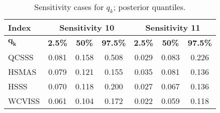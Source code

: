 \documentclass[11pt]{book}\usepackage[]{graphicx}\usepackage[]{color}
\newcommand{\subscr}[1]{$_{\text{#1}}$}
\begin{document}
\begin{table}[H]
\centering
\caption{\label{tab:sensitivities-q}Sensitivity cases for $q_k$; posterior quantiles.}
\begin{tabular}{lcccccc}
\hline
\textbf{Index}  & \multicolumn{3}{c}{\textbf{Sensitivity 10}} & \multicolumn{3}{c}{\textbf{Sensitivity 11}} \\
\hline
 $\mathbf{q_k}$ & \textbf{2.5\%} & \textbf{50\%} & \textbf{97.5\%} & \textbf{2.5\%} & \textbf{50\%} & \textbf{97.5\%} \\
\hline
QCSSS  & 0.081 & 0.158 & 0.508 & 0.029 & 0.083 & 0.226 \\
HSMAS  & 0.079 & 0.121 & 0.155 & 0.035 & 0.081 & 0.136 \\
HSSS   & 0.070 & 0.118 & 0.200 & 0.027 & 0.067 & 0.136 \\
WCVISS & 0.061 & 0.104 & 0.172 & 0.022 & 0.059 & 0.118 \\
\hline
\end{tabular}
\end{table}

\end{document}
